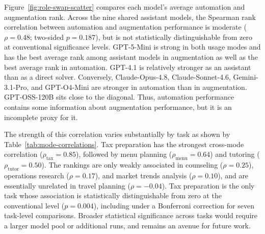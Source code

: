 
Figure~\ref{fig:role-swap-scatter} compares each model's average automation and augmentation rank. Across the nine shared assistant models, the Spearman rank correlation between automation and augmentation performance is moderate ($\rho=0.48$; two-sided $p=0.187$), but is not statistically distinguishable
from zero at conventional significance levels. GPT-5-Mini is strong in both usage modes and has the best average rank among assistant models in augmentation as well as the best average rank in automation. GPT-4.1 is relatively stronger as an assistant than as a direct solver. Conversely, Claude-Opus-4.8, Claude-Sonnet-4.6, Gemini-3.1-Pro, and GPT-O4-Mini are stronger in automation than in augmentation. GPT-OSS-120B sits close to the diagonal. Thus, automation performance contains some information about augmentation performance, but it is an incomplete proxy for it.




The strength of this correlation varies substantially by task as shown by Table~\ref{tab:mode-correlations}. Tax preparation has the strongest cross-mode correlation ($\rho_{\mathrm{tax}}=0.85$), followed by menu planning ($\rho_{\mathrm{menu}}=0.64$) and tutoring ($\rho_{\mathrm{tutor}}=0.50$). The rankings are only weakly associated in counseling ($\rho=0.25$), operations research ($\rho=0.17$), and market trends analysis ($\rho=0.10$), and are essentially unrelated in travel planning ($\rho=-0.04$). Tax preparation is the only task whose association is statistically distinguishable from zero at the conventional level ($p=0.004$), including under a Bonferroni correction for seven task-level comparisons. Broader statistical significance across tasks would require a larger model pool or additional runs, and remains an avenue for future work.

